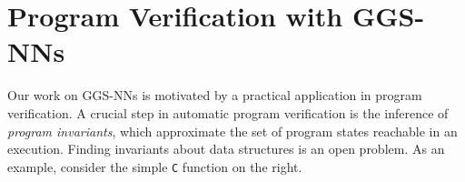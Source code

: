 \documentclass{article} %
\newcommand{\OurMethodShort}{GGS-NN}
\newcommand{\OurMethodShorts}{\OurMethodShort s}
\begin{document}





\section{Program Verification with \OurMethodShorts}
\label{sect:ProgramVerification}

Our work on \OurMethodShorts{} is motivated by a practical application in
program verification.
A crucial step in automatic program verification is the inference of
\emph{program invariants}, which
approximate the set of program states
reachable in an execution.
Finding invariants about data structures is an open problem.
As an example, consider the simple \texttt{C} function on the right.
\end{document}
